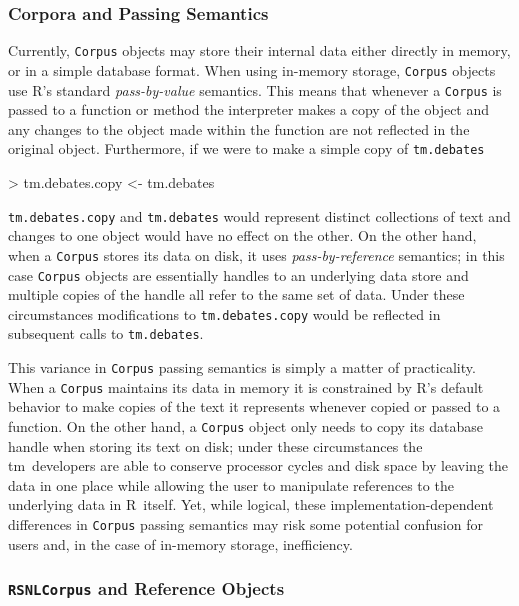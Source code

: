 \documentclass[11pt]{article}
\def\R{\textsf{R}}
\def\tm{{\normalfont\fontseries{b}\selectfont tm}}
\let\code=\texttt
\let\rclass=\texttt
\begin{document}
\subsubsection{Corpora and Passing Semantics}

Currently, \rclass{Corpus} objects may store their internal data
either directly in memory, or in a simple database format.  When using
in-memory storage, \rclass{Corpus} objects use \R's standard
\emph{pass-by-value} semantics.  This means that whenever a \rclass{Corpus}
is passed to a function or method the interpreter makes a copy of the
object and any changes to the object made within the function are not
reflected in the original object.  Furthermore, if we were to make a
simple copy of \code{tm.debates}
\begin{Schunk}
\begin{Sinput}
> tm.debates.copy <- tm.debates
\end{Sinput}
\end{Schunk}
\code{tm.debates.copy} and \code{tm.debates} would represent distinct
collections of text and changes to one object would have no effect on
the other.  On the other hand, when a
\rclass{Corpus} stores its data on disk, it uses
\emph{pass-by-reference} semantics; in this case \rclass{Corpus}
objects are essentially handles to an underlying data store and
multiple copies of the handle all refer to the same set of data.
Under these circumstances modifications to \code{tm.debates.copy}
would be reflected in subsequent calls to \code{tm.debates}.

This variance in \rclass{Corpus} passing semantics is simply a matter
of practicality.  When a \rclass{Corpus} maintains its data in memory
it is constrained by \R's default behavior to make copies of the text
it represents whenever copied or passed to a function.  On the other
hand, a \rclass{Corpus} object only needs to copy its database handle
when storing its text on disk; under these circumstances the \tm\
developers are able to conserve processor cycles and disk space by
leaving the data in one place while allowing the user to manipulate
references to the underlying data in \R\ itself.  Yet, while logical,
these implementation-dependent differences in \rclass{Corpus} passing
semantics may risk some potential confusion for users and, in the case
of in-memory storage, inefficiency.

\subsubsection{\rclass{RSNLCorpus} and Reference Objects}
\end{document}
